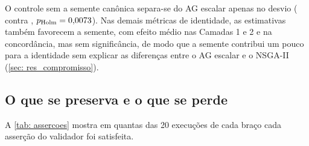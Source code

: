 O controle sem a semente canônica separa-se do AG escalar apenas no desvio (\driftSemSem{} contra \driftAG{}, $p_{\mathrm{Holm}} = 0{,}0073{}$). Nas demais métricas de identidade, as estimativas também favorecem a semente, com efeito médio nas Camadas 1 e 2 e na concordância, mas sem significância, de modo que a semente contribui um pouco para a identidade sem explicar as diferenças entre o AG escalar e o NSGA-II (\autoref{sec: res_compromisso}).

\subsection{O que se preserva e o que se perde}
\label{sub: res_perdas}

A \autoref{tab: assercoes} mostra em quantas das 20 execuções de cada braço cada asserção do validador foi satisfeita.

